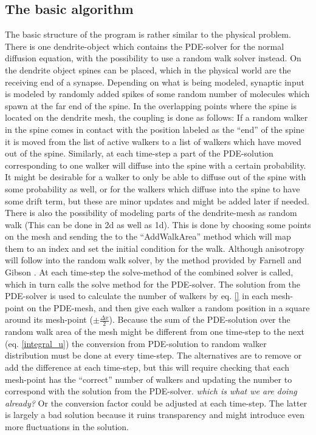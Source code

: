 \subsection{The basic algorithm}\label{basic_algorithm}

The basic structure of the program is rather similar to the physical problem.
There is one dendrite-object which contains the PDE-solver for the normal diffusion equation, with the possibility to use a random walk solver instead. 
On the dendrite object spines can be placed, which in the physical world are the receiving end of a synapse. 
Depending on what is being modeled, synaptic input is modeled by randomly added spikes of some random number of molecules which spawn at the far end of the spine. 
In the overlapping points where the spine is located on the dendrite mesh, the coupling is done as follows: 
If a random walker in the spine comes in contact with the position labeled as the ``end'' of the spine it is moved from the list of active walkers to a list of walkers which have moved out of the spine. 
Similarly, at each time-step a part of the PDE-solution corresponding to one walker will diffuse into the spine with a certain probability. 
It might be desirable for a walker to only be able to diffuse out of the spine with some probability as well, or for the walkers which diffuse into the spine to have some drift term, but these are minor updates and might be added later if needed. \\

There is also the possibility of modeling parts of the dendrite-mesh as random walk (This can be done in 2d as well as 1d). 
This is done by choosing some points on the mesh and sending the to the ``AddWalkArea'' method which will map them to an index and set the initial condition for the walk. 
Although anisotropy will follow into the random walk solver, by the method provided by Farnell and Gibson \cite{farnell2005monte}. 
At each time-step the solve-method of the combined solver is called, which in turn calls the solve method for the PDE-solver. 
The solution from the PDE-solver is used to calculate the number of walkers by eq. \ref{} in each mesh-point on the PDE-mesh, and then give each walker a random position in a square around its mesh-point ($\pm \frac{\Delta x}{2}$). 
Because the sum of the PDE-solution over the random walk area of the mesh might be different from one time-step to the next (eq. \ref{integral_u}) the conversion from PDE-solution to random walker distribution must be done at every time-step. 
The alternatives are to remove or add the difference at each time-step, but this will require checking that each mesh-point has the ``correct'' number of walkers and updating the number to correspond with the solution from the PDE-solver. \emph{which is what we are doing already?}
Or the conversion factor could be adjusted at each time-step. The latter is largely a bad solution because it ruins transparency and might introduce even more fluctuations in the solution.


